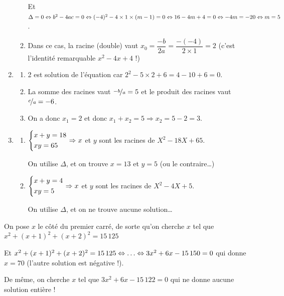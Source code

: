 \documentclass[a4paper,11pt]{article}
\begin{document}
\begin{enumerate}
\begin{enumerate}
		Et $\Delta = 0 \Leftrightarrow b^2-4ac = 0 \Leftrightarrow (-4)^2 - 4 \times 1 \times (m-1) = 0 \Leftrightarrow 16-4m+4 = 0 \Leftrightarrow -4m = -20 \Leftrightarrow m=5$.
		\item Dans ce cas, la racine (double) vaut $x_0=\dfrac{-b}{2a}=\dfrac{-(-4)}{2 \times 1} = 2$ (c'est l'identité remarquable $x^2-4x+4$ !)
	\end{enumerate}
	\item 
	\begin{enumerate}
		\item 2 est solution de l'équation car $2^2-5 \times 2 + 6 = 4 - 10 + 6 =0$.
		\item La somme des racines vaut $\nicefrac{-b}{a} = 5$ et le produit des racines vaut $\nicefrac{c}{a}=-6$.
		\item On a donc $x_1=2$ et donc $x_1 + x_2 = 5 \Rightarrow x_2 = 5 - 2 =3$.
	\end{enumerate}
	\item 
	\begin{enumerate}
		\item $\begin{dcases} x+y=18 \\xy=65 \end{dcases} \Rightarrow x$ et $y$ sont les racines de $X^2-18X+65$.
		
		On utilise $\Delta$, et on trouve $x=13$ et $y=5$ (ou le contraire\dots)
		\item $\begin{dcases} x+y=4 \\xy=5 \end{dcases} \Rightarrow x$ et $y$ sont les racines de $X^2-4X+5$.
		
		On utilise $\Delta$, et on ne trouve aucune solution\dots
	\end{enumerate}
\end{enumerate}

\medskip


\medskip

On pose $x$ le côté du premier carré, de sorte qu'on cherche $x$ tel que $x^2+(x+1)^2+(x+2)^2=15\,125 $

Et $x^2+(x+1)^2+(x+2)^2=15\,125 \ssi \dots \ssi 3x^2 + 6x-15\,150 = 0$ qui donne $x=70$ (l'autre solution est négative !).

\smallskip

De même, on cherche $x$ tel que $3x^2+6x-15\,122=0$ qui ne donne aucune solution entière !

\medskip
\end{document}
